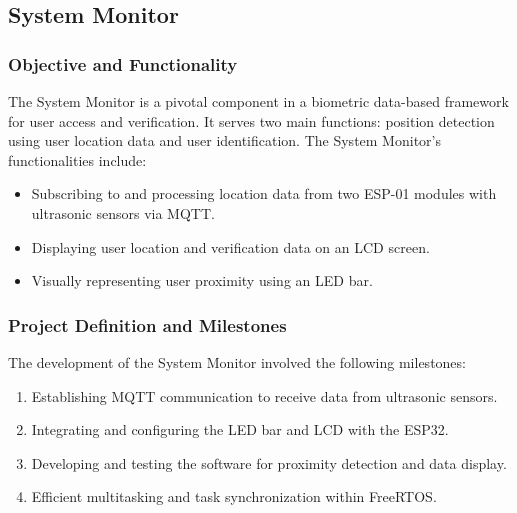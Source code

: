 \documentclass{article}
\begin{document}
\subsection{System Monitor}

\subsubsection{Objective and Functionality}
The System Monitor is a pivotal component in a biometric data-based framework for user access and verification. It serves two main functions: position detection using user location data and user identification. The System Monitor's functionalities include:
\begin{itemize}
    \item Subscribing to and processing location data from two ESP-01 modules with ultrasonic sensors via MQTT.
    \item Displaying user location and verification data on an LCD screen.
    \item Visually representing user proximity using an LED bar.
\end{itemize}

\subsubsection{Project Definition and Milestones}
The development of the System Monitor involved the following milestones:
\begin{enumerate}
    \item Establishing MQTT communication to receive data from ultrasonic sensors.
    \item Integrating and configuring the LED bar and LCD with the ESP32.
    \item Developing and testing the software for proximity detection and data display.
    \item Efficient multitasking and task synchronization within FreeRTOS.
\end{enumerate}
\end{document}
